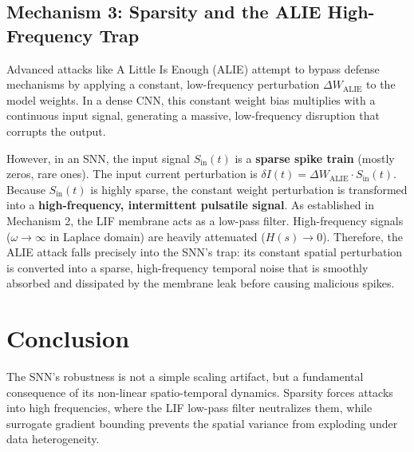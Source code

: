 \documentclass[11pt,a4paper]{article}
\begin{document}
\subsection{Mechanism 3: Sparsity and the ALIE High-Frequency Trap}
Advanced attacks like A Little Is Enough (ALIE) attempt to bypass defense mechanisms by applying a constant, low-frequency perturbation $\Delta W_{\text{ALIE}}$ to the model weights. In a dense CNN, this constant weight bias multiplies with a continuous input signal, generating a massive, low-frequency disruption that corrupts the output.

However, in an SNN, the input signal $S_{\text{in}}(t)$ is a \textbf{sparse spike train} (mostly zeros, rare ones). The input current perturbation is $\delta I(t) = \Delta W_{\text{ALIE}} \cdot S_{\text{in}}(t)$.
Because $S_{\text{in}}(t)$ is highly sparse, the constant weight perturbation is transformed into a \textbf{high-frequency, intermittent pulsatile signal}.
As established in Mechanism 2, the LIF membrane acts as a low-pass filter. High-frequency signals ($\omega \to \infty$ in Laplace domain) are heavily attenuated ($H(s) \to 0$). Therefore, the ALIE attack falls precisely into the SNN's trap: its constant spatial perturbation is converted into a sparse, high-frequency temporal noise that is smoothly absorbed and dissipated by the membrane leak before causing malicious spikes.

\section{Conclusion}
The SNN's robustness is not a simple scaling artifact, but a fundamental consequence of its non-linear spatio-temporal dynamics. Sparsity forces attacks into high frequencies, where the LIF low-pass filter neutralizes them, while surrogate gradient bounding prevents the spatial variance from exploding under data heterogeneity.
\end{document}
